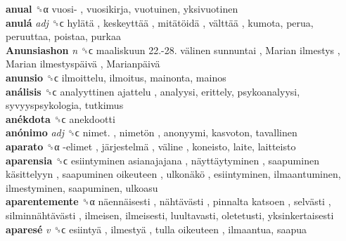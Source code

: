 \textbf{anual} ␝α   vuosi- , vuosikirja, vuotuinen, yksivuotinen  \\
\textbf{anulá} \emph{adj}  ␝ϲ   hylätä ,  keskeyttää ,  mitätöidä ,  välttää , kumota, perua, peruuttaa, poistaa, purkaa  \\
\textbf{Anunsiashon} \emph{n}  ␝ϲ   maaliskuun 22.-28. välinen sunnuntai ,  Marian ilmestys ,  Marian ilmestyspäivä ,  Marianpäivä   \\
\textbf{anunsio} ␝ϲ  ilmoittelu, ilmoitus, mainonta, mainos  \\
\textbf{análisis} ␝ϲ   analyyttinen ajattelu , analyysi, erittely, psykoanalyysi, syvyyspsykologia, tutkimus  \\
\textbf{anékdota} ␝ϲ  anekdootti  \\
\textbf{anónimo} \emph{adj}  ␝ϲ   nimet. ,  nimetön , anonyymi, kasvoton, tavallinen  \\
\textbf{aparato} ␝α   -elimet ,  järjestelmä ,  väline , koneisto, laite, laitteisto  \\
\textbf{aparensia} ␝ϲ   esiintyminen asianajajana ,  näyttäytyminen ,  saapuminen käsittelyyn ,  saapuminen oikeuteen ,  ulkonäkö , esiintyminen, ilmaantuminen, ilmestyminen, saapuminen, ulkoasu  \\
\textbf{aparentemente} ␝α   näennäisesti ,  nähtävästi ,  pinnalta katsoen ,  selvästi ,  silminnähtävästi , ilmeisen, ilmeisesti, luultavasti, oletetusti, yksinkertaisesti  \\
\textbf{aparesé} \emph{v}  ␝ϲ   esiintyä ,  ilmestyä ,  tulla oikeuteen , ilmaantua, saapua  \\
